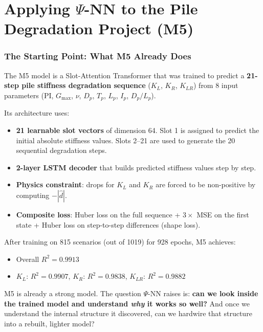 \documentclass[11pt,a4paper]{article}
\begin{document}

\part{Applying $\Psi$-NN to the Pile Degradation Project (M5)}

\section{The Starting Point: What M5 Already Does}

The M5 model is a Slot-Attention Transformer that was trained to predict a \textbf{21-step pile stiffness degradation sequence} ($K_L$, $K_R$, $K_{LR}$) from 8 input parameters (PI, $G_{\max}$, $\nu$, $D_p$, $T_p$, $L_p$, $I_p$, $D_p/L_p$).

Its architecture uses:
\begin{itemize}[nosep]
    \item \textbf{21 learnable slot vectors} of dimension 64. Slot 1 is assigned to predict the initial absolute stiffness values. Slots 2--21 are used to generate the 20 sequential degradation steps.
    \item \textbf{2-layer LSTM decoder} that builds predicted stiffness values step by step.
    \item \textbf{Physics constraint}: drops for $K_L$ and $K_R$ are forced to be non-positive by computing $-|\hat{d}|$.
    \item \textbf{Composite loss}: Huber loss on the full sequence + $3\times$ MSE on the first state + Huber loss on step-to-step differences (shape loss).
\end{itemize}

After training on 815 scenarios (out of 1019) for 928 epochs, M5 achieves:
\begin{itemize}[nosep]
    \item Overall $R^2 = 0.9913$
    \item $K_L$: $R^2 = 0.9907$, $K_R$: $R^2 = 0.9838$, $K_{LR}$: $R^2 = 0.9882$
\end{itemize}

M5 is already a strong model. The question $\Psi$-NN raises is: \textbf{can we look inside the trained model and understand \textit{why} it works so well?} And once we understand the internal structure it discovered, can we hardwire that structure into a rebuilt, lighter model?
\end{document}
